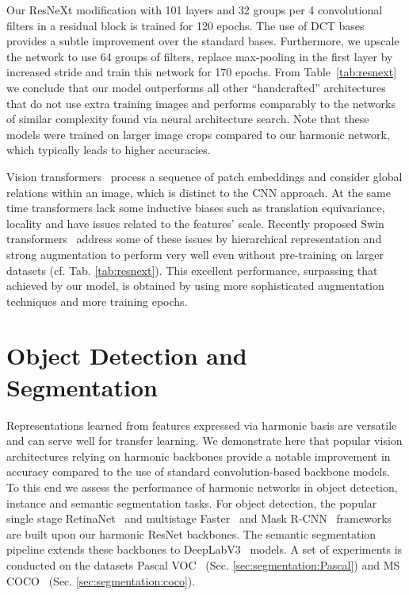 \documentclass[12pt,a4paper]{article}
\begin{document}
Our ResNeXt modification with 101 layers and 32 groups per 4 convolutional filters in a residual block is trained for 120 epochs. The use of DCT bases provides a subtle improvement over the standard bases. Furthermore, we upscale the network to use 64 groups of filters, replace max-pooling in the first layer by increased stride and train this network for 170 epochs. From Table~\ref{tab:resnext} we conclude that our model outperforms all other ``handcrafted'' architectures that do not use extra training images and performs comparably to the networks of similar complexity found via neural architecture search. Note that {these models were trained on larger image crops compared to our harmonic network, which typically leads to higher accuracies.}

Vision transformers~\cite{Liu21} process a sequence of patch embeddings and consider global relations within an image, which is distinct to the CNN approach. At the same time transformers lack some inductive biases such as translation equivariance, locality and have issues related to the features' scale. Recently proposed Swin transformers~\cite{Liu21} address some of these issues by hierarchical representation and strong augmentation to perform very well even without pre-training on larger datasets (cf. Tab. \ref{tab:resnext}). This excellent performance, surpassing that achieved by our model, is obtained by using more sophisticated augmentation techniques and more training epochs.



\section{Object Detection and Segmentation}
\label{sec:experiments.detection}

Representations learned from features expressed via harmonic basis are versatile and can serve well for transfer learning.  We demonstrate here that popular vision architectures relying on harmonic backbones provide a notable improvement in accuracy compared to the use of standard convolution-based backbone models. To this end we assess the performance of harmonic networks in object detection, instance and semantic segmentation tasks. For object detection, the popular single stage RetinaNet~\cite{Lin17b} and multistage Faster~\cite{Ren15} and Mask R-CNN~\cite{He17} frameworks are built upon our harmonic ResNet backbones. The semantic segmentation pipeline extends these backbones to DeepLabV3~\cite{Chen17rethinking} models. A set of experiments is conducted on the datasets Pascal VOC~\cite{pascal} (Sec. \ref{sec:segmentation:Pascal}) and MS COCO~\cite{mscoco} (Sec. \ref{sec:segmentation:coco}).
\end{document}
